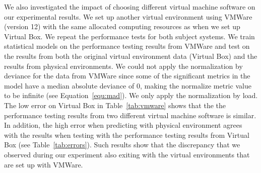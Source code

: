 We also investigated the impact of choosing different virtual machine software on our experimental results. We set up another virtual environment using VMWare (version 12) with the same allocated computing resources as when we set up Virtual Box. We repeat the performance tests for both subject systems. We train statistical models on the performance testing results from VMWare and test on the results from both the original virtual environment data (Virtual Box) and the results from physical environments. We could not apply the normalization by deviance for the data from VMWare since some of the significant metrics in the model have a median absolute deviance of 0, making the normalize metric value to be infinite (see Equation~\ref{equ:mad}). We only apply the normalization by load. The low error on Virtual Box in Table~\ref{tab:vmware} shows that the the performance testing results from two different virtual machine software is similar. In addition, the high error when predicting with physical environment agrees with the results when testing with the performance testing results from Virtual Box (see Table~\ref{tab:errors}). Such results show that the discrepancy that we observed during our experiment also exiting with the virtual environments that are set up with VMWare.



